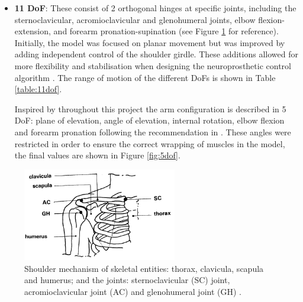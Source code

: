 \begin{itemize}
    \item \textbf{11 \ac{DoF}}: These consist of 2 orthogonal hinges at specific joints, including the sternoclavicular, acromioclavicular and glenohumeral joints, elbow flexion-extension, and forearm pronation-supination (see Figure \ref{fig:measuring} for reference).  Initially, the model was focused on planar movement but was improved by adding independent control of the shoulder girdle. These additions allowed for more flexibility and stabilisation when designing the neuroprosthetic control algorithm \cite{RT3D}. The range of motion of the different DoFs is shown in Table \ref{table:11dof}.\newline
    
    Inspired by \cite{RT3D} throughout this project the arm configuration is described in 5 \ac{DoF}: plane of elevation, angle of elevation, internal rotation, elbow flexion and forearm pronation following the recommendation in \cite{ISB}. These angles were restricted in order to ensure the correct wrapping of muscles in the model, the final values are shown in Figure \ref{fig:5dof}.
\end{itemize}

\begin{figure}[h!]
    \centering
    \includegraphics[width=0.6\textwidth]{Pictures/DAS/Joints.png}
    \caption{Shoulder mechanism of skeletal entities: thorax, clavicula, scapula and humerus; and the joints: sternoclavicular (SC) joint, acromioclavicular joint (AC) and glenohumeral joint (GH) \cite{Measuringmuscleandjoint}. }
    \label{fig:measuring}
\end{figure}

